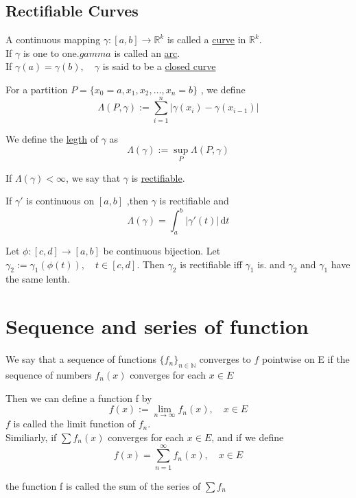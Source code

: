 \subsection{Rectifiable Curves}

\begin{definition}
    A continuous mapping $ \gamma: [a,b]\rightarrow \mathbb{R}^k $ is called a \underline{curve} in $ \mathbb{R}^k $. \\
    If $ \gamma $ is one to one.$ gamma $ is called an \underline{arc}.\\
    If $ \gamma(a)=\gamma(b),\quad \gamma $ is said to be a \underline{closed curve}
\end{definition}

For a partition $ P=\{x_0=a,x_1,x_2,\ldots,x_n=b\} $ , we define 
\[\Lambda (P,\gamma):=\sum\limits_{i=1}^{n } |\gamma(x_i)-\gamma(x_{i-1})|\]

We define the \underline{legth} of $ \gamma $ as 
\[\Lambda(\gamma):= \sup\limits_P \Lambda(P,\gamma)\]

If $ \Lambda(\gamma)<\infty $, we say that $ \gamma $ is \underline{rectifiable}.

\begin{theorem}
    If $ \gamma' $ is continuous on $ [a,b] $ ,then $ \gamma $ is rectifiable and 
    \[\Lambda(\gamma)=\int_{a }^{b } |\gamma'(t)|\, \mathrm{d}t  \]  
\end{theorem}

\begin{remark}
    Let $ \phi:[c,d]\rightarrow[a,b]  $ be continuous bijection. Let $ \gamma_2:=\gamma_1(\phi(t)),\quad t\in[c,d]   $.
    Then $ \gamma_2 $  is rectifiable iff $ \gamma_1 $   is. and $ \gamma_2 $ and  $ \gamma_1  $ have the same lenth.
    
\end{remark}
\section{Sequence and series of function}

We say that a sequence of functions $ \{f_n\}_{n\in \mathbb{N}} $ converges to $ f $ pointwise on E if the sequence of numbers $ {f_n(x)} $ 
converges for each $ x\in E $   

Then we can define a function f by
\[f(x):=\lim_{n\to \infty}f_n(x), \quad x\in E\]
$ f  $ is called the limit function of $ {f_n} $.\\ 

Similiarly, if $ \sum f_n(x) $ converges for each $ x\in E  $, and if we define
\[f(x)=\sum\limits_{n=1}^{\infty} f_n(x),\quad x\in E\]

the function f is called the sum of the series of $ \sum f_n $ 

